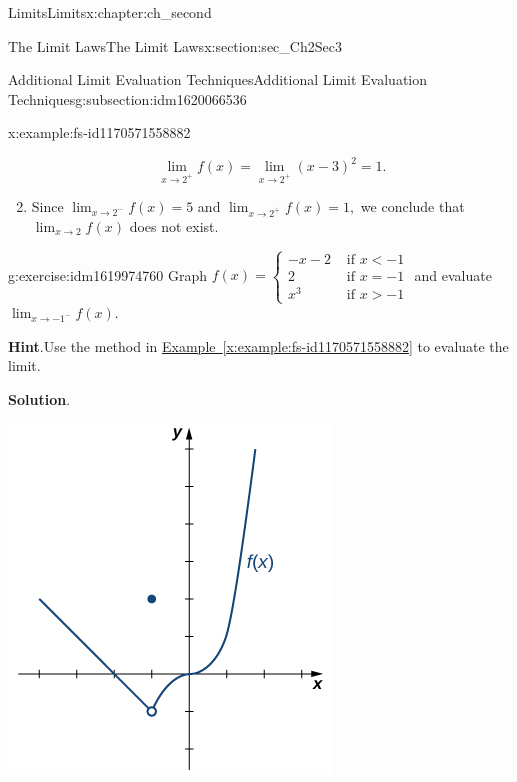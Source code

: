 \documentclass[oneside,10pt,]{book}
\newcommand{\blocktitlefont}{\relax}
\newcommand{\xreffont}{\relax}
\numberwithin{equation}{section}
\newcommand{\lt}{<}
\newcommand{\gt}{>}
\newcommand{\amp}{&}
\begin{document}
\begin{chapterptx}{Limits}{}{Limits}{}{}{x:chapter:ch_second}
\begin{sectionptx}{The Limit Laws}{}{The Limit Laws}{}{}{x:section:sec_Ch2Sec3}
\begin{subsectionptx}{Additional Limit Evaluation Techniques}{}{Additional Limit Evaluation Techniques}{}{}{g:subsection:idm1620066536}
\begin{example}{}{x:example:fs-id1170571558882}
\begin{enumerate}[label=(\alph*)]
\begin{equation*}
\lim_{x \to 2^+}f(x)=\lim_{x \to 2^+}(x-3)^2=1.
\end{equation*}
%
\item{}Since \(\lim_{x \to 2^-}f(x)=5\) and \(\lim_{x \to 2^+}f(x)=1,\) we conclude that \(\lim_{x \to 2 }f(x)\) does not exist.%
\end{enumerate}
\end{example}
\begin{inlineexercise}{}{g:exercise:idm1619974760}%
Graph \(f(x)=\begin{cases}-x-2 \amp \text{ if } x\lt -1 \\ 2 \amp \text{ if } x=-1 \\ x^3 \amp \text{ if } x\gt -1 \end{cases} \) and evaluate \(\lim_{x\to -1^-}f(x).\)%
\par\smallskip%
\noindent\textbf{\blocktitlefont Hint}.\hypertarget{g:hint:idm1619971816}{}\quad{}Use the method in \hyperref[x:example:fs-id1170571558882]{Example~{\xreffont\ref{x:example:fs-id1170571558882}}} to evaluate the limit.%
\par\smallskip%
\noindent\textbf{\blocktitlefont Solution}.\hypertarget{g:solution:idm1619972200}{}\quad{} \begin{image}{0.25}{0.5}{0.25}%
\includegraphics[width=\linewidth]{external/CNX_Calc_Figure_02_03_004.jpg}

\end{image}
\end{inlineexercise}
\end{subsectionptx}
\end{sectionptx}
\end{chapterptx}
\end{document}
